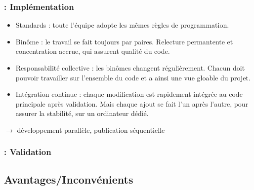 \begin{frame}
\frametitle{\insertsubsection : Implémentation}
\begin{itemize}
\item Standards : toute l'équipe adopte les mêmes règles de programmation.
\item Binôme : le travail se fait toujours par paires. Relecture permantente et concentration accrue, qui assurent qualité du code.
\item Responsabilité collective : les binômes changent régulièrement. Chacun doit pouvoir travailler sur l'ensemble du code et a ainsi une vue gloable du projet.
\item Intégration continue : chaque modification est rapidement intégrée au code principale après validation. Mais chaque ajout se fait l'un après l'autre, pour assurer la stabilité, sur un ordinateur dédié.
\end{itemize}

\begin{center}
$\longrightarrow$  développement parallèle, publication séquentielle 
\end{center}
\end{frame}

\begin{frame}
\frametitle{\insertsubsection : Validation}

\end{frame}

\subsection{Avantages/Inconvénients}
\begin{frame}
\frametitle{\insertsubsection}
\end{frame}